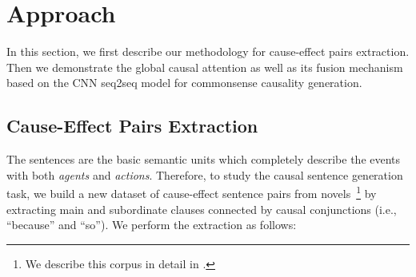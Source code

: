 \section{Approach}
\label{sec:approach}
In this section, we first describe our methodology for 
cause-effect pairs extraction. 
Then we demonstrate the global causal attention as well as its fusion mechanism based on the CNN seq2seq model for commonsense causality generation.

\subsection{Cause-Effect Pairs Extraction}
The sentences are the basic semantic units which completely describe the events with both \emph{agents} and \emph{actions}.
Therefore, to study the causal sentence generation task, we build a new dataset of cause-effect sentence pairs from novels~\footnote{We describe this corpus in detail in .} by extracting main and subordinate clauses connected by causal conjunctions (i.e., ``because'' and ``so''). 
We perform the extraction as follows:

